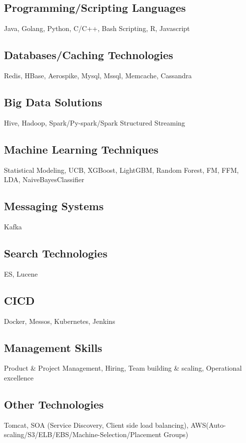 \documentclass[8pt,a4paper]{article}
\begin{document}
\begin{multicols}{2}
\subsection{Programming/Scripting Languages}
Java, Golang, Python, C/C++, Bash Scripting, R, Javascript
\subsection{Databases/Caching Technologies}
Redis, HBase, Aerospike, Mysql, Mssql, Memcache, Cassandra
\subsection{Big Data Solutions}
Hive, Hadoop, Spark/Py-spark/Spark Structured Streaming
\subsection{Machine Learning Techniques}
Statistical Modeling, UCB, XGBoost, LightGBM, Random Forest, FM, FFM, LDA, NaiveBayesClassifier
\subsection{Messaging Systems}
Kafka
\subsection{Search Technologies}
ES, Lucene
\subsection{CICD}
Docker, Messos, Kubernetes, Jenkins
\subsection{Management Skills}
Product \& Project Management, Hiring, Team building \& scaling, Operational excellence
\subsection{Other Technologies}
Tomcat, SOA (Service Discovery, Client side load balancing), AWS(Auto-scaling/S3/ELB/EBS/Machine-Selection/Placement Groups)



\end{multicols}
\end{document}
